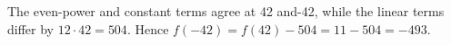 The even-power and constant terms agree at 42 and-42, while the linear terms differ by $12\cdot42=504$. Hence $f(-42)=f(42)-504=11-504=\boxed{-493}$.

